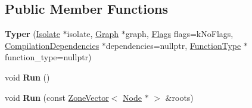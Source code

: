 \subsection*{Public Member Functions}
\begin{DoxyCompactItemize}
\item 
{\bfseries Typer} (\hyperlink{classv8_1_1internal_1_1_isolate}{Isolate} $\ast$isolate, \hyperlink{classv8_1_1internal_1_1compiler_1_1_graph}{Graph} $\ast$graph, \hyperlink{classv8_1_1base_1_1_flags}{Flags} flags=k\+No\+Flags, \hyperlink{classv8_1_1internal_1_1_compilation_dependencies}{Compilation\+Dependencies} $\ast$dependencies=nullptr, \hyperlink{classv8_1_1internal_1_1_function_type}{Function\+Type} $\ast$function\+\_\+type=nullptr)\hypertarget{classv8_1_1internal_1_1compiler_1_1_typer_ac496be5e25da0213df597e90ad43107d}{}\label{classv8_1_1internal_1_1compiler_1_1_typer_ac496be5e25da0213df597e90ad43107d}

\item 
void {\bfseries Run} ()\hypertarget{classv8_1_1internal_1_1compiler_1_1_typer_a237e27a719f52772f0c03bb181dd67b1}{}\label{classv8_1_1internal_1_1compiler_1_1_typer_a237e27a719f52772f0c03bb181dd67b1}

\item 
void {\bfseries Run} (const \hyperlink{classv8_1_1internal_1_1_zone_vector}{Zone\+Vector}$<$ \hyperlink{classv8_1_1internal_1_1compiler_1_1_node}{Node} $\ast$ $>$ \&roots)\hypertarget{classv8_1_1internal_1_1compiler_1_1_typer_aa590f92fff0e87a20771428878cc723e}{}\label{classv8_1_1internal_1_1compiler_1_1_typer_aa590f92fff0e87a20771428878cc723e}

\end{DoxyCompactItemize}
